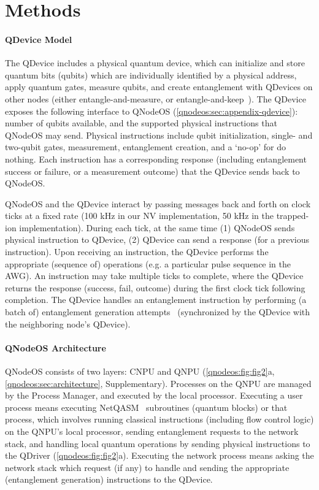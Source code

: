 \section{Methods}
\label{qnodeos:sec:methods}

\paragraph{QDevice Model}

The QDevice includes a physical quantum device, which can initialize and store quantum bits (qubits) which are individually identified by a physical address, apply quantum gates, measure qubits, and create entanglement with QDevices on other nodes (either entangle-and-measure, or entangle-and-keep~\cite{dahlberg_2019_egp}). The QDevice exposes the following interface to QNodeOS (\cref{qnodeos:sec:appendix-qdevice}): number of qubits available, and the supported physical instructions that QNodeOS may send. Physical instructions include qubit initialization, single- and two-qubit gates, measurement, entanglement creation, and a `no-op' for do nothing. Each instruction has a corresponding response (including entanglement success or failure, or a measurement outcome) that the QDevice sends back to QNodeOS.

QNodeOS and the QDevice interact by passing messages back and forth on clock ticks at a fixed rate (100 kHz in our NV implementation, 50 kHz in the trapped-ion implementation). During each tick, at the same time (1) QNodeOS sends physical instruction to QDevice, (2) QDevice can send a response (for a previous instruction). Upon receiving an instruction, the QDevice performs the appropriate (sequence of) operations (e.g. a particular pulse sequence in the AWG). An instruction may take multiple ticks to complete, where the QDevice returns the response (success, fail, outcome) during the first clock tick following completion. The QDevice handles an entanglement instruction by performing (a batch of) entanglement generation attempts~\cite{pompili_2022_experimental} (synchronized by the QDevice with the neighboring node's QDevice). 

\paragraph{QNodeOS Architecture}

QNodeOS consists of two layers: CNPU and QNPU (\cref{qnodeos:fig:fig2}a, \cref{qnodeos:sec:architecture}, Supplementary). Processes on the QNPU are managed by the Process Manager, and executed by the local processor. Executing a user process means executing NetQASM~\cite{dahlberg_2022_netqasm} subroutines (quantum blocks) or that process, which involves running classical instructions (including flow control logic) on the QNPU's local processor, sending entanglement requests to the network stack, and handling local quantum operations by sending physical instructions to the QDriver (\cref{qnodeos:fig:fig2}a). Executing the network process means asking the network stack which request (if any) to handle and sending the appropriate (entanglement generation) instructions to the QDevice. 

